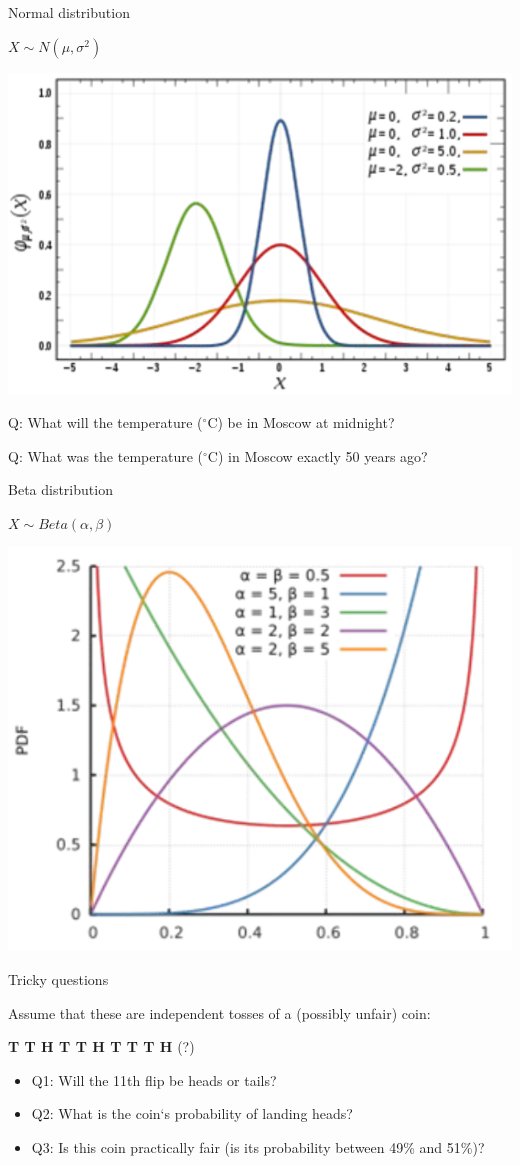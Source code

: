 \begin{frame}{Normal distribution}
\centering

$X \sim N(\mu, \sigma^2)$

\includegraphics[width=0.50\linewidth]{../LectureAssets/L01/dist_N}

\bigskip
\pause
{\color{red} Q:} What will the temperature ($^\circ$C) be in Moscow at midnight?
\pause
\bigskip

{\color{red} Q:} What was the temperature ($^\circ$C) in Moscow exactly 50 years ago?
\bigskip
\end{frame}

\begin{frame}{Beta distribution}
\centering

$X \sim Beta(\alpha, \beta)$

\includegraphics[width=0.50\linewidth]{../LectureAssets/L01/dist_B}

\bigskip

\bigskip
\end{frame}


\begin{frame}{Tricky questions}

Assume that these are independent tosses of a (possibly unfair) coin:

\begin{center}
\textbf{T  T  H  T  T  H  T  T  T  H} {\color{red}(?)}
\end{center}

\begin{small}
\bigskip
\begin{itemize}
\item {\color{red} Q1:} Will the 11th flip be heads or tails?\pause
\item {\color{red} Q2:} What is the coin‘s probability of landing heads?\pause
\item {\color{red} Q3:} Is this coin practically fair (is its probability between 49\% and 51\%)?
\end{itemize}
\end{small}
\bigskip
\end{frame}



